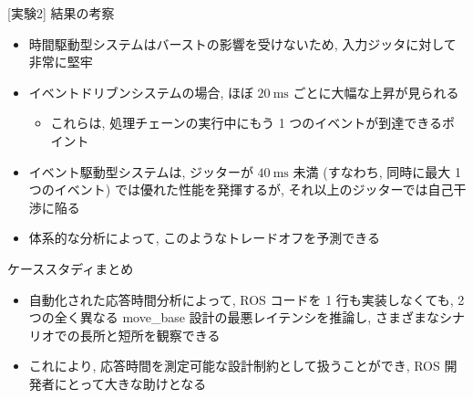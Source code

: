 \begin{frame}{[実験2] 結果の考察}
    \begin{itemize}
        \item 時間駆動型システムはバーストの影響を受けないため, 入力ジッタに対して非常に堅牢
        \item イベントドリブンシステムの場合, ほぼ $20 \mathrm{~ms}$ ごとに大幅な上昇が見られる
              \begin{itemize}
                  \item これらは, 処理チェーンの実行中にもう 1 つのイベントが到達できるポイント
              \end{itemize}
        \item イベント駆動型システムは, ジッターが $40 \mathrm{~ms}$ 未満 (すなわち, 同時に最大 1 つのイベント) では優れた性能を発揮するが, それ以上のジッターでは自己干渉に陥る
        \item 体系的な分析によって, このようなトレードオフを予測できる
    \end{itemize}
\end{frame}

\begin{frame}{ケーススタディまとめ}
    \begin{itemize}
        \item 自動化された応答時間分析によって, ROS コードを 1 行も実装しなくても, 2 つの全く異なる move\_base 設計の最悪レイテンシを推論し, さまざまなシナリオでの長所と短所を観察できる
        \item これにより, 応答時間を測定可能な設計制約として扱うことができ, ROS 開発者にとって大きな助けとなる
    \end{itemize}
\end{frame}
